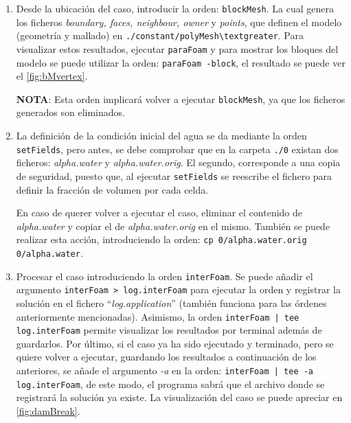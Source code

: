 \begin{enumerate}
\def\labelenumi{\arabic{enumi}.}
\item
  Desde la ubicación del caso, introducir la orden: \texttt{blockMesh}.
  La cual genera los ficheros \emph{boundary, faces, neighbour, owner} y
  \emph{points}, que definen el modelo (geometría y mallado) en
  \lstinline[style=bash]{./constant/polyMesh\textgreater}. Para visualizar estos
  resultados, ejecutar \texttt{paraFoam} y para mostrar los bloques del
  modelo se puede utilizar la orden: \texttt{paraFoam\ -block}, el resultado se puede ver el \autoref{fig:bMvertex}.



  \textbf{NOTA}: Esta orden implicará volver a ejecutar
  \texttt{blockMesh}, ya que los ficheros generados son eliminados.
\item
  La definición de la condición inicial del agua se da mediante la orden
  \texttt{setFields}, pero antes, se debe comprobar que en la carpeta
  \lstinline[style=bash]{./0} existan dos ficheros: \emph{alpha.water}
  y \emph{alpha.water.orig}. El segundo, corresponde a una copia de
  seguridad, puesto que, al ejecutar \texttt{setFields} se reescribe el
  fichero para definir la fracción de volumen por cada celda.

  En caso de querer volver a ejecutar el caso, eliminar el contenido de
  \emph{alpha.water} y copiar el de \emph{alpha.water.orig} en el mismo.
  También se puede realizar esta acción, introduciendo la orden:
  \lstinline[style=bash]{cp 0/alpha.water.orig 0/alpha.water}.
\item
  Procesar el caso introduciendo la orden \texttt{interFoam}. Se puede
  añadir el argumento \lstinline[style=bash]{interFoam > log.interFoam}
  para ejecutar la orden y registrar la solución en el fichero
  ``\emph{log.application}'' (también funciona para las órdenes
  anteriormente mencionadas). Asimismo, la orden
  \lstinline[style=bash]{interFoam | tee log.interFoam} permite visualizar
  los resultados por terminal además de guardarlos. Por último, si el
  caso ya ha sido ejecutado y terminado, pero se quiere volver a
  ejecutar, guardando los resultados a continuación de los anteriores,
  se añade el argumento \emph{-a} en la orden:
  \lstinline[style=bash]{interFoam | tee -a log.interFoam}, de este modo,
  el programa sabrá que el archivo donde se registrará la solución ya
  existe. La visualización del caso se puede apreciar en \autoref{fig:damBreak}.
\end{enumerate}

